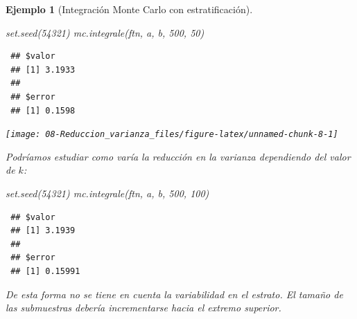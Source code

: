 \documentclass[
  10pt,
]{book}
\newenvironment{Shaded}{\begin{snugshade}}{\end{snugshade}}
\newcommand{\DecValTok}[1]{\textcolor[rgb]{0.00,0.00,0.81}{#1}}
\newcommand{\FunctionTok}[1]{\textcolor[rgb]{0.00,0.00,0.00}{#1}}
\newcommand{\NormalTok}[1]{#1}
\theoremstyle{break}
\newtheorem{example}{Ejemplo}[chapter]
\theoremstyle{nonumberplain}
\begin{document}
\begin{example}[Integración Monte Carlo con estratificación]
\begin{Shaded}
\begin{Highlighting}[]
\FunctionTok{set.seed}\NormalTok{(}\DecValTok{54321}\NormalTok{)}
\FunctionTok{mc.integrale}\NormalTok{(ftn, a, b, }\DecValTok{500}\NormalTok{, }\DecValTok{50}\NormalTok{)}
\end{Highlighting}
\end{Shaded}

\begin{verbatim}
 ## $valor
 ## [1] 3.1933
 ## 
 ## $error
 ## [1] 0.1598
\end{verbatim}

\begin{center}\texttt{[image: 08-Reduccion\_varianza\_files/figure-latex/unnamed-chunk-8-1]} \end{center}

Podríamos estudiar como varía la reducción en la varianza dependiendo del valor de \(k\):

\begin{Shaded}
\begin{Highlighting}[]
\FunctionTok{set.seed}\NormalTok{(}\DecValTok{54321}\NormalTok{)}
\FunctionTok{mc.integrale}\NormalTok{(ftn, a, b, }\DecValTok{500}\NormalTok{, }\DecValTok{100}\NormalTok{)}
\end{Highlighting}
\end{Shaded}

\begin{verbatim}
 ## $valor
 ## [1] 3.1939
 ## 
 ## $error
 ## [1] 0.15991
\end{verbatim}

De esta forma no se tiene en cuenta la variabilidad en el estrato.
El tamaño de las submuestras debería incrementarse hacia el extremo superior.
\end{example}
\end{document}
